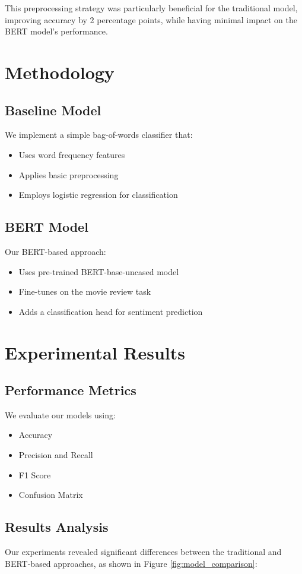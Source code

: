 \documentclass[numbers,nonatbib]{article}
\begin{document}
This preprocessing strategy was particularly beneficial for the traditional model, improving accuracy by 2 percentage points, while having minimal impact on the BERT model's performance.

\section{Methodology}
\subsection{Baseline Model}
We implement a simple bag-of-words classifier that:
\begin{itemize}
    \item Uses word frequency features
    \item Applies basic preprocessing
    \item Employs logistic regression for classification
\end{itemize}

\subsection{BERT Model}
Our BERT-based approach:
\begin{itemize}
    \item Uses pre-trained BERT-base-uncased model
    \item Fine-tunes on the movie review task
    \item Adds a classification head for sentiment prediction
\end{itemize}

\section{Experimental Results}
\subsection{Performance Metrics}
We evaluate our models using:
\begin{itemize}
    \item Accuracy
    \item Precision and Recall
    \item F1 Score
    \item Confusion Matrix
\end{itemize}

\subsection{Results Analysis}
Our experiments revealed significant differences between the traditional and BERT-based approaches, as shown in Figure \ref{fig:model_comparison}:
\end{document}
